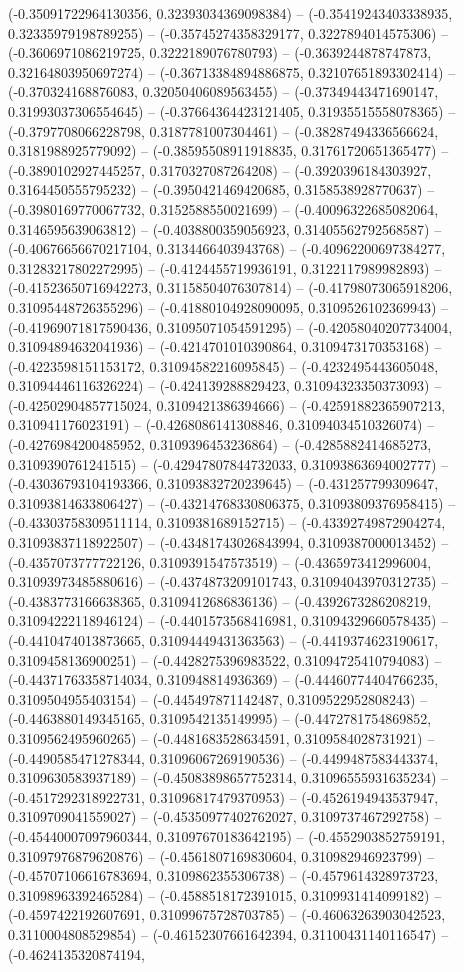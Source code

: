 (-0.35091722964130356, 0.32393034369098384) -- (-0.35419243403338935, 0.32335979198789255) -- (-0.35745274358329177, 0.3227894014575306) -- (-0.3606971086219725, 0.3222189076780793) -- (-0.3639244878747873, 0.32164803950697274) -- (-0.36713384894886875, 0.32107651893302414) -- (-0.370324168876083, 0.32050406089563455) -- (-0.37349443471690147, 0.31993037306554645) -- (-0.37664364423121405, 0.31935515558078365) -- (-0.3797708066228798, 0.3187781007304461) -- (-0.38287494336566624, 0.3181988925779092) -- (-0.38595508911918835, 0.31761720651365477) -- (-0.3890102927445257, 0.3170327087264208) -- (-0.3920396184303927, 0.3164450555795232) -- (-0.3950421469420685, 0.3158538928770637) -- (-0.3980169770067732, 0.3152588550021699) -- (-0.40096322685082064, 0.3146595639063812) -- (-0.4038800359056923, 0.31405562792568587) -- (-0.40676656670217104, 0.3134466403943768) -- (-0.40962200697384277, 0.31283217802272995) -- (-0.4124455719936191, 0.3122117989982893) -- (-0.41523650716942273, 0.31158504076307814) -- (-0.41798073065918206, 0.31095448726355296) -- (-0.41880104928090095, 0.3109526102369943) -- (-0.41969071817590436, 0.31095071054591295) -- (-0.42058040207734004, 0.31094894632041936) -- (-0.4214701010390864, 0.3109473170353168) -- (-0.4223598151153172, 0.31094582216095845) -- (-0.4232495443605048, 0.31094446116326224) -- (-0.424139288829423, 0.31094323350373093) -- (-0.42502904857715024, 0.3109421386394666) -- (-0.42591882365907213, 0.310941176023191) -- (-0.4268086141308846, 0.31094034510326074) -- (-0.4276984200485952, 0.3109396453236864) -- (-0.4285882414685273, 0.3109390761241515) -- (-0.42947807844732033, 0.31093863694002777) -- (-0.43036793104193366, 0.31093832720239645) -- (-0.431257799309647, 0.31093814633806427) -- (-0.43214768330806375, 0.31093809376958415) -- (-0.43303758309511114, 0.3109381689152715) -- (-0.43392749872904274, 0.31093837118922507) -- (-0.43481743026843994, 0.3109387000013452) -- (-0.4357073777722126, 0.3109391547573519) -- (-0.4365973412996004, 0.31093973485880616) -- (-0.4374873209101743, 0.31094043970312735) -- (-0.4383773166638365, 0.3109412686836136) -- (-0.4392673286208219, 0.31094222118946124) -- (-0.4401573568416981, 0.31094329660578435) -- (-0.4410474013873665, 0.31094449431363563) -- (-0.4419374623190617, 0.3109458136900251) -- (-0.4428275396983522, 0.31094725410794083) -- (-0.44371763358714034, 0.310948814936369) -- (-0.44460774404766235, 0.3109504955403154) -- (-0.445497871142487, 0.3109522952808243) -- (-0.4463880149345165, 0.3109542135149995) -- (-0.4472781754869852, 0.3109562495960265) -- (-0.4481683528634591, 0.3109584028731921) -- (-0.4490585471278344, 0.31096067269190536) -- (-0.4499487583443374, 0.3109630583937189) -- (-0.45083898657752314, 0.31096555931635234) -- (-0.4517292318922731, 0.31096817479370953) -- (-0.4526194943537947, 0.3109709041559027) -- (-0.45350977402762027, 0.3109737467292758) -- (-0.45440007097960344, 0.31097670183642195) -- (-0.4552903852759191, 0.31097976879620876) -- (-0.4561807169830604, 0.310982946923799) -- (-0.45707106616783694, 0.3109862355306738) -- (-0.4579614328973723, 0.31098963392465284) -- (-0.4588518172391015, 0.3109931414099182) -- (-0.4597422192607691, 0.31099675728703785) -- (-0.46063263903042523, 0.3110004808529854) -- (-0.46152307661642394, 0.31100431140116547) -- (-0.4624135320874194, 
